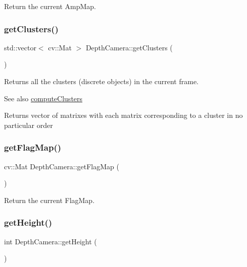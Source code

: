 Return the current Amp\+Map. 

\hypertarget{class_depth_camera_a18d88b8df2a08c9c167207fea587d66e}{}\label{class_depth_camera_a18d88b8df2a08c9c167207fea587d66e} 
\subsubsection{\texorpdfstring{get\+Clusters()}{getClusters()}}
{\footnotesize\ttfamily std\+::vector$<$ cv\+::\+Mat $>$ Depth\+Camera\+::get\+Clusters (\begin{DoxyParamCaption}{ }\end{DoxyParamCaption})}



Returns all the clusters (discrete objects) in the current frame. 

\begin{DoxySeeAlso}{See also}
\hyperlink{class_depth_camera_a009719ec313de883b617903360bdf519}{compute\+Clusters} 
\end{DoxySeeAlso}
\begin{DoxyReturn}{Returns}
vector of matrixes with each matrix corresponding to a cluster in no particular order 
\end{DoxyReturn}
\hypertarget{class_depth_camera_a348cd41559a416a61780073f5369b032}{}\label{class_depth_camera_a348cd41559a416a61780073f5369b032} 
\subsubsection{\texorpdfstring{get\+Flag\+Map()}{getFlagMap()}}
{\footnotesize\ttfamily cv\+::\+Mat Depth\+Camera\+::get\+Flag\+Map (\begin{DoxyParamCaption}{ }\end{DoxyParamCaption})}



Return the current Flag\+Map. 

\hypertarget{class_depth_camera_a430070d82a2bfc2583fd8290ca7bb8d6}{}\label{class_depth_camera_a430070d82a2bfc2583fd8290ca7bb8d6} 
\subsubsection{\texorpdfstring{get\+Height()}{getHeight()}}
{\footnotesize\ttfamily int Depth\+Camera\+::get\+Height (\begin{DoxyParamCaption}{ }\end{DoxyParamCaption})}



